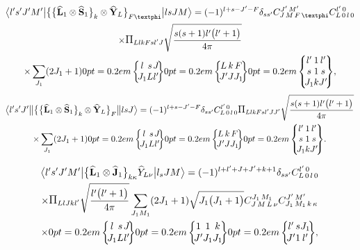 \begin{multline}
\braOket{ l^{\prime} s^{\prime} J^{\prime} M^{\prime}}{\bigl\{\bigl\{\widehat{\vect{L}}_{1} \otimes \widehat{\vect{S}}_{1}\bigr\}_{k} \otimes \widehat{\vect{Y}}_{L}\bigr\}_{F \varphi}}{l s J M}=(-1)^{l+s-J^{\prime}-F} \delta_{s s^{\prime}} 
\clebsch{J}{M}{F}{\varphi}{J^{\prime}}{M^{\prime}} 
\clebsch{L}{0}{l}{0}{l^{\prime}}{0} \\
 \times \Fact{L l k F s l^{\prime} J}\sqrt{\frac{s(s+1) l^{\prime}\bigl(l^{\prime}+1\bigr)}{4 \pi}} \\
 \times \sum_{J_{1}}(2 J_{1}+1)
\sixj{l}{s}{J}{J_{1}}{L}{l^{\prime}}
\sixj{L}{k}{F}{J^{\prime}}{J}{J_{1}}
\ninej{l^{\prime}}{1}{l^{\prime}}{s}{1}{s}{J_{1}}{k}{J^{\prime}},  \label{eq:13:2:143}
\end{multline}
\begin{multline*}
\braOketred{ l^{\prime} s^{\prime} J^{\prime}}{\bigl\{\bigl\{\widehat{\vect{L}}_{1} \otimes \widehat{\vect{S}}_{1}\bigr\}_{k} \otimes \widehat{\vect{Y}}_{L}\bigr\}_{F}}{l s J}=(-1)^{l+s-J^{\prime}-F} \delta_{s s^{\prime}}
\clebsch{L}{0}{l}{0}{l^{\prime}}{0}
\Fact{L l k F s l^{\prime} J J^{\prime}}\sqrt{\frac{s(s+1) l^{\prime}\bigl(l^{\prime}+1\bigr)}{4 \pi}} \\
\times \sum_{J_{1}}(2 J_{1}+1)
\sixj{l}{s}{J}{J_{1}}{L}{l^{\prime}}
\sixj{L}{k}{F}{J^{\prime}}{J}{J_{1}}
\ninej{l^{\prime}}{1}{l^{\prime}}{s}{1}{s}{J_{1}}{k}{J^{\prime}}.
\end{multline*}

\begin{multline}
 \braOket{ l^{\prime} s^{\prime} J^{\prime} M^{\prime}}{\bigl\{\widehat{\vect{L}}_{1} \otimes \widehat{\vect{J}}_{1}\bigr\}_{k \kappa} \widehat{Y}_{L \nu}}{l_{s} J M}=(-1)^{l+l^{\prime}+J+J^{\prime}+k+1} \delta_{s s^{\prime}} 
\clebsch{L}{0}{l}{0}{l^{\prime}}{0} \\
\times \Fact{L l J k l^{\prime}}\sqrt{\frac{l^{\prime}\bigl(l^{\prime}+1\bigr)}{4 \pi}} \sum_{J_{1} M_{1}}(2 J_{1}+1) \sqrt{J_{1}\bigl(J_{1}+1\bigr)} 
\clebsch{J}{M}{L}{\nu}{J_{1}}{M_{1}} 
\clebsch{J_{1}}{M_{1}}{k}{\kappa}{J^{\prime}}{M^{\prime}} \\
 \times
\sixj{l}{s}{J}{J_{1}}{L}{l^{\prime}}
\sixj{1}{1}{k}{J^{\prime}}{J_{1}}{J_{1}}
\sixj{l^{\prime}}{s}{J_{1}}{J^{\prime}}{1}{l^{\prime}},  \label{eq:13:2:144}
\end{multline}


